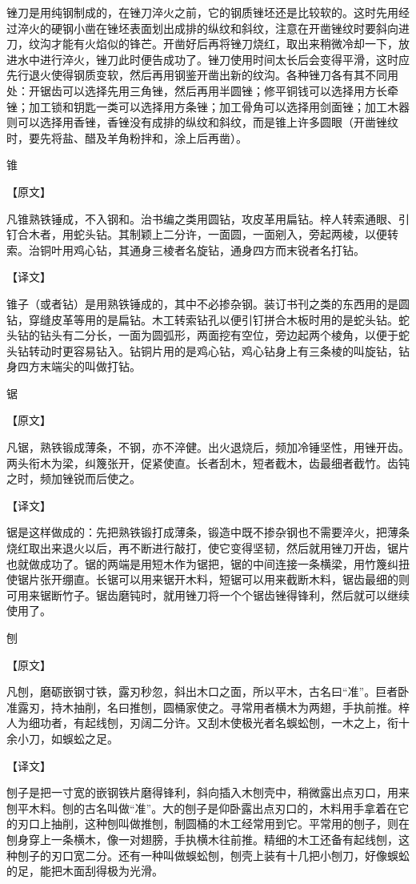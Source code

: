 \documentclass[12pt,UTF8]{ctexbook}
\begin{document}
锉刀是用纯钢制成的，在锉刀淬火之前，它的钢质锉坯还是比较软的。这时先用经过淬火的硬钢小凿在锉坯表面划出成排的纵纹和斜纹，注意在开凿锉纹时要斜向进刀，纹沟才能有火焰似的锋芒。开凿好后再将锉刀烧红，取出来稍微冷却一下，放进水中进行淬火，锉刀此时便告成功了。锉刀使用时间太长后会变得平滑，这时应先行退火使得钢质变软，然后再用钢鉴开凿出新的纹沟。各种锉刀各有其不同用处：开锯齿可以选择先用三角锉，然后再用半圆锉；修平铜钱可以选择用方长牵锉；加工锁和钥匙一类可以选择用方条锉；加工骨角可以选择用剑面锉；加工木器则可以选择用香锉，香锉没有成排的纵纹和斜纹，而是锥上许多圆眼（开凿锉纹时，要先将盐、醋及羊角粉拌和，涂上后再凿）。

锥

【原文】

凡锥熟铁锤成，不入钢和。治书编之类用圆钻，攻皮革用扁钻。梓人转索通眼、引钉合木者，用蛇头钻。其制颖上二分许，一面圆，一面剜入，旁起两棱，以便转索。治铜叶用鸡心钻，其通身三棱者名旋钻，通身四方而末锐者名打钻。

【译文】

锥子（或者钻）是用熟铁锤成的，其中不必掺杂钢。装订书刊之类的东西用的是圆钻，穿缝皮革等用的是扁钻。木工转索钻孔以便引钉拼合木板时用的是蛇头钻。蛇头钻的钻头有二分长，一面为圆弧形，两面挖有空位，旁边起两个棱角，以便于蛇头钻转动时更容易钻入。钻铜片用的是鸡心钻，鸡心钻身上有三条棱的叫旋钻，钻身四方末端尖的叫做打钻。

锯

【原文】

凡锯，熟铁锻成薄条，不钢，亦不淬健。出火退烧后，频加冷锤坚性，用锉开齿。两头衔木为梁，纠篾张开，促紧使直。长者刮木，短者截木，齿最细者截竹。齿钝之时，频加锉锐而后使之。

【译文】

锯是这样做成的：先把熟铁锻打成薄条，锻造中既不掺杂钢也不需要淬火，把薄条烧红取出来退火以后，再不断进行敲打，使它变得坚韧，然后就用锉刀开齿，锯片也就做成功了。锯的两端是用短木作为锯把，锯的中间连接一条横梁，用竹篾纠扭使锯片张开绷直。长锯可以用来锯开木料，短锯可以用来截断木料，锯齿最细的则可用来锯断竹子。锯齿磨钝时，就用锉刀将一个个锯齿锉得锋利，然后就可以继续使用了。

刨

【原文】

凡刨，磨砺嵌钢寸铁，露刃秒忽，斜出木口之面，所以平木，古名曰“准”。巨者卧准露刃，持木抽削，名曰推刨，圆桶家使之。寻常用者横木为两翅，手执前推。梓人为细功者，有起线刨，刃阔二分许。又刮木使极光者名蜈蚣刨，一木之上，衔十余小刀，如蜈蚣之足。

【译文】

刨子是把一寸宽的嵌钢铁片磨得锋利，斜向插入木刨壳中，稍微露出点刃口，用来刨平木料。刨的古名叫做“准”。大的刨子是仰卧露出点刃口的，木料用手拿着在它的刃口上抽削，这种刨叫做推刨，制圆桶的木工经常用到它。平常用的刨子，则在刨身穿上一条横木，像一对翅膀，手执横木往前推。精细的木工还备有起线刨，这种刨子的刃口宽二分。还有一种叫做蜈蚣刨，刨壳上装有十几把小刨刀，好像蜈蚣的足，能把木面刮得极为光滑。
\end{document}
